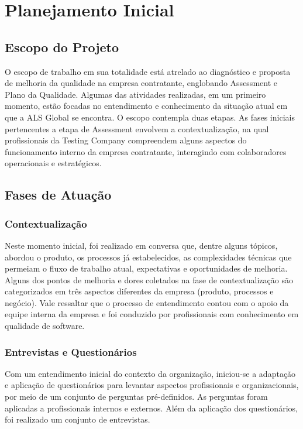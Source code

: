 \documentclass[12pt,a4paper]{report}
\begin{document}
\chapter{Planejamento Inicial}

\section{Escopo do Projeto}

O escopo de trabalho em sua totalidade está atrelado ao diagnóstico e proposta de melhoria da qualidade na empresa contratante, englobando Assessment e Plano da Qualidade. Algumas das atividades realizadas, em um primeiro momento, estão focadas no entendimento e conhecimento da situação atual em que a ALS Global se encontra. O escopo contempla duas etapas. As fases iniciais pertencentes a etapa de Assessment envolvem a contextualização, na qual profissionais da Testing Company compreendem alguns aspectos do funcionamento interno da empresa contratante, interagindo com colaboradores operacionais e estratégicos.



\section{Fases de Atuação}

\subsection{Contextualização}

Neste momento inicial, foi realizado em conversa que, dentre alguns tópicos, abordou o produto, os processos já estabelecidos, as complexidades técnicas que permeiam o fluxo de trabalho atual, expectativas e oportunidades de melhoria. Alguns dos pontos de melhoria e dores coletados na fase de contextualização são categorizados em três aspectos diferentes da empresa (produto, processos e negócio). Vale ressaltar que o processo de entendimento contou com o apoio da equipe interna da empresa e foi conduzido por profissionais com conhecimento em qualidade de software. 

\subsection{Entrevistas e Questionários}

Com um entendimento inicial do contexto da organização, iniciou-se a adaptação e aplicação de questionários para levantar aspectos profissionais e organizacionais, por meio de um conjunto de perguntas pré-definidos. As perguntas foram aplicadas a profissionais internos e externos. Além da aplicação dos questionários, foi realizado um conjunto de entrevistas.
\end{document}
